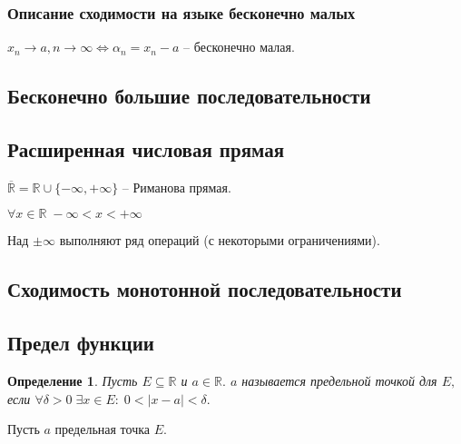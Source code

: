 \documentclass{article}
\newtheorem{Definition}{Определение}[section]
\begin{document}
\subsubsection{Описание сходимости на языке бесконечно малых}
$x_n \rightarrow a, n\rightarrow\infty \Leftrightarrow \alpha_n=x_n-a$ -- бесконечно малая.

\subsection{Бесконечно большие последовательности}

\subsection{Расширенная числовая прямая}
$\overline{\mathbb{R}}=\mathbb{R}\cup\{-\infty, +\infty\}$ -- Риманова прямая.

$\forall x\in\mathbb{R} \; -\infty<x<+\infty$

Над $\pm\infty$ выполняют ряд операций (с некоторыми ограничениями).

\subsection{Сходимость монотонной последовательности}


\newpage

\begin{center}
\section{\LARGE{\bf Предел функции}}
\end{center}

\begin{Definition}
Пусть $E\subseteq\mathbb{R}$ и $a\in\mathbb{R}.$ $a$ называется предельной точкой для $E,$ если $\forall\delta>0\;\exists x\in E: \; 0<\mid x-a\mid<\delta.$
\end{Definition}

Пусть $a$ предельная точка $E.$

 
\end{document}
